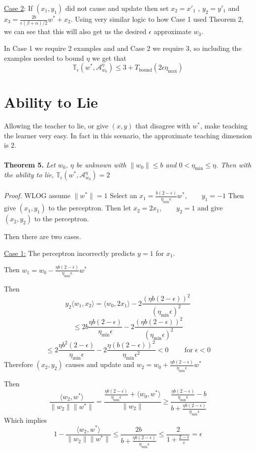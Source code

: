 \documentclass{article}
\newcommand{\learn}{\mathcal{A}_{w_0}^\eta}
\begin{document}
\underline{Case 2}: If $(x_1, y_1)$ did not cause and update then set $x_2 = x'_1$ , $y_2 = y'_1$ and $x_3 = \frac{2b}{\epsilon (\beta + \alpha)/2}w^* + x_2$. Using very similar logic to how Case 1 used Theorem 2, we can see that this will also get us the desired $\epsilon$ approximate $w_3$.

In Case 1 we require 2 examples and and Case 2 we require 3, so including the examples needed to bound $\eta$ we get that 
$$
\mathbb{T}_\epsilon(w^*, \learn) \leq 3 + T_{\text{bound}}(2\epsilon \eta_{\max})
$$

\section{Ability to Lie}
Allowing the teacher to lie, or give $(x,y)$ that disagree with $w^*$, make teaching the learner very easy. In fact in this scenario, the approximate teaching dimension is $2$.
\\
\\
\textbf{Theorem 5.} \textit{
Let $w_0$, $\eta$ be unknown with $\lVert w_0 \rVert \leq b$ and $0 < \eta_{\min} \leq \eta$.
Then with the ability to lie, $\mathbb{T}_{\epsilon}(w^*, \learn) = 2$
}
\\
\\
\textit{Proof.}
WLOG assume $\lVert w^* \rVert = 1$
Select an $x_1 = \frac{b(2-\epsilon)}{\eta_{\min} \epsilon}w^*, \qquad y_1 = -1$
Then give $(x_1 , y _1)$ to the perceptron.
Then let $x_2 = 2x_1, \qquad y_2 = 1$ and give $(x_2, y_2)$ to the perceptron.

Then there are two cases.

\underline{Case 1:} The perceptron incorrectly predicts $y = 1$ for $x_1$.

Then 
$
w_1 = w_0 - \frac{\eta b(2-\epsilon)}{\eta_{\min} \epsilon}w^*
$

Then 
$$y_2 \langle w_1, x_2 \rangle
 = \langle w_0, 2x_1 \rangle - 2\frac{(\eta b(2-\epsilon))^2}{(\eta_{\min}\epsilon)^2}
$$
$$
 \leq 2b\frac{\eta b(2-\epsilon)}{\eta_{\min}\epsilon}
-  2\frac{(\eta b(2-\epsilon))^2}{(\eta_{\min}\epsilon)^2} 
$$
$$
\leq 2\frac{\eta b^2(2-\epsilon)}{\eta_{\min}\epsilon}
-  2\frac{\eta (b(2-\epsilon))^2}{\eta_{\min}\epsilon^2}
< 0 \qquad \text{ for } \epsilon < 0
$$
Therefore $(x_2, y_2)$ causes and update and
$w_2 =  w_0 + \frac{\eta b(2-\epsilon)}{\eta_{\min} \epsilon}w^* $

Then
$$
\frac{\langle w_2 , w^* \rangle}{\lVert w_2 \rVert \lVert w^* \rVert} = \frac{\frac{\eta b(2-\epsilon)}{\eta_{\min} \epsilon} + \langle w_0, w^* \rangle}{\lVert w_2 \rVert} \geq \frac{\frac{\eta b(2-\epsilon)}{\eta_{\min} \epsilon} - b}{b + \frac{\eta b(2-\epsilon)}{\eta_{\min} \epsilon}}
$$
Which implies
$$
1 - \frac{\langle w_2 , w^* \rangle}{\lVert w_2 \rVert \lVert w^* \rVert} \leq \frac{2b}{b + \frac{\eta b(2-\epsilon)}{\eta_{\min} \epsilon}}
\leq
\frac{2}{1 + \frac{2-\epsilon}{\epsilon}} = \epsilon
$$
\end{document}
